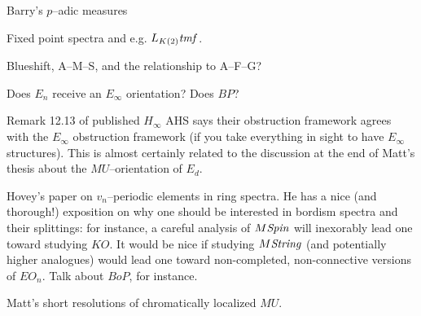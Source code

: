 Barry's $p$--adic measures

Fixed point spectra and e.g. $L_{K(2)} \mathit{tmf}$.

Blueshift, A--M--S, and the relationship to A--F--G?

Does $E_n$ receive an $E_\infty$ orientation?  Does $BP$?

Remark 12.13 of published $H_\infty$ AHS says their obstruction framework agrees with the $E_\infty$ obstruction framework (if you take everything in sight to have $E_\infty$ structures).  This is almost certainly related to the discussion at the end of Matt's thesis about the $MU$--orientation of $E_d$.

Hovey's paper on $v_n$--periodic elements in ring spectra.  He has a nice (and thorough!) exposition on why one should be interested in bordism spectra and their splittings: for instance, a careful analysis of $M\mathit{Spin}$ will inexorably lead one toward studying $KO$.  It would be nice if studying $M\mathit{String}$ (and potentially higher analogues) would lead one toward non-completed, non-connective versions of $EO_n$.  Talk about $BoP$, for instance.

Matt's short resolutions of chromatically localized $MU$.
